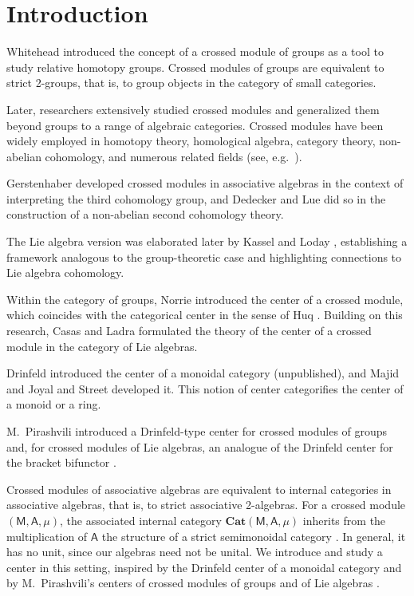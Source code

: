 \documentclass[12pt,reqno]{amsart}
\theoremstyle{plain}
\theoremstyle{definition}
\theoremstyle{remark}
\newcommand{\A}{\ensuremath{\mathsf{A}}}
\newcommand{\MM}{\ensuremath{\mathsf{M}}}
\newcommand{\Cat}{\ensuremath{\mathbf{Cat}}}
\numberwithin{equation}{section}
\begin{document}
\maketitle


\section{Introduction}

Whitehead \cite{Wh} introduced the concept of a crossed module of groups as a tool to study relative homotopy groups. Crossed modules of groups are equivalent to strict 2-groups, that is,
 to group objects in the category of small categories.

Later, researchers extensively studied crossed modules and generalized them beyond groups to a range of algebraic categories.
 Crossed modules have been widely employed in homotopy theory, homological algebra, category theory, non-abelian cohomology, and numerous related fields (see, e.g.~\cite{Wa}). 

Gerstenhaber \cite{Ger} developed crossed modules in associative algebras in the context of interpreting the third cohomology group,
 and Dedecker and Lue \cite{DL} did so in the construction of a non-abelian second cohomology theory.

The Lie algebra version was elaborated later by Kassel and Loday \cite{KL}, establishing a framework analogous to the group-theoretic case and highlighting connections to Lie algebra cohomology.  

Within the category of groups, Norrie \cite{Nor} introduced  the center of a crossed module, which coincides with the categorical center in the sense of Huq \cite{Huq}.
Building on this research, Casas and Ladra \cite{CaLa} formulated the theory of the center of a crossed module in the category of Lie algebras.  

Drinfeld introduced the center of a monoidal category (unpublished), and Majid \cite{Ma} and Joyal and Street \cite{JS} developed it. This notion of center categorifies the center of a monoid or a ring.

M.~Pirashvili introduced a Drinfeld-type center for crossed modules of groups \cite{Pim1} and, for crossed modules of Lie algebras, an analogue of the  Drinfeld center for the bracket bifunctor \cite{Pim2}. 

Crossed modules of associative algebras are equivalent to internal categories
in associative algebras, that is, to strict associative 2-algebras. For a
crossed module $(\MM,\A,\mu)$, the associated internal category
$\Cat(\MM,\A,\mu)$ inherits from the multiplication of $\A$ the structure of a strict semimonoidal category \cite{JK}. In
general, it has no unit, since our algebras need not be unital. We introduce
and study a center in this setting, inspired by the Drinfeld center of a
monoidal category and by M.~Pirashvili's centers of crossed modules of groups
and of Lie algebras \cite{Pim1,Pim2}.
\end{document}
